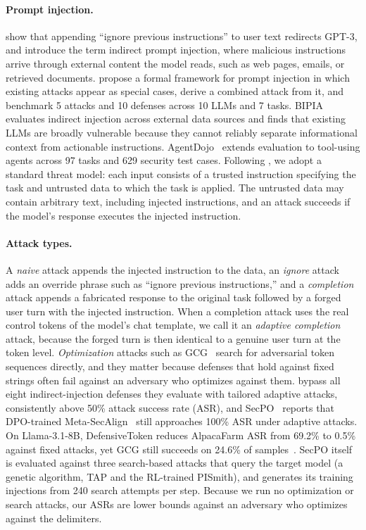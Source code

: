 \documentclass{article}
\begin{document}
\paragraph{Prompt injection.} \citet{perez2022ignore} show that appending ``ignore previous instructions'' to user text redirects GPT-3, and \citet{greshake2023not} introduce the term indirect prompt injection, where malicious instructions arrive through external content the model reads, such as web pages, emails, or retrieved documents. \citet{liu2024formalizing} propose a formal framework for prompt injection in which existing attacks appear as special cases, derive a combined attack from it, and benchmark 5 attacks and 10 defenses across 10 LLMs and 7 tasks. BIPIA~\cite{yi2023bipia} evaluates indirect injection across external data sources and finds that existing LLMs are broadly vulnerable because they cannot reliably separate informational context from actionable instructions. AgentDojo~\cite{debenedetti2024agentdojo} extends evaluation to tool-using agents across 97 tasks and 629 security test cases. Following \citet{chen2025struq}, we adopt a standard threat model: each input consists of a trusted instruction specifying the task and untrusted data to which the task is applied. The untrusted data may contain arbitrary text, including injected instructions, and an attack succeeds if the model's response executes the injected instruction.

\paragraph{Attack types.} A \emph{naive} attack appends the injected instruction to the data, an \emph{ignore} attack adds an override phrase such as ``ignore previous instructions,'' and a \emph{completion} attack appends a fabricated response to the original task followed by a forged user turn with the injected instruction. When a completion attack uses the real control tokens of the model's chat template, we call it an \emph{adaptive completion} attack, because the forged turn is then identical to a genuine user turn at the token level. \emph{Optimization} attacks such as GCG~\cite{zou2023gcg} search for adversarial token sequences directly, and they matter because defenses that hold against fixed strings often fail against an adversary who optimizes against them. \citet{zhan2025adaptive} bypass all eight indirect-injection defenses they evaluate with tailored adaptive attacks, consistently above 50\% attack success rate (ASR), and SecPO~\cite{chen2026secpo} reports that DPO-trained Meta-SecAlign~\cite{chen2025metasecalign} still approaches 100\% ASR under adaptive attacks. On Llama-3.1-8B, DefensiveToken reduces AlpacaFarm ASR from 69.2\% to 0.5\% against fixed attacks, yet GCG still succeeds on 24.6\% of samples~\cite{chen2025defensivetoken}. SecPO itself is evaluated against three search-based attacks that query the target model (a genetic algorithm, TAP and the RL-trained PISmith), and generates its training injections from 240 search attempts per step. Because we run no optimization or search attacks, our ASRs are lower bounds against an adversary who optimizes against the delimiters.
\end{document}
